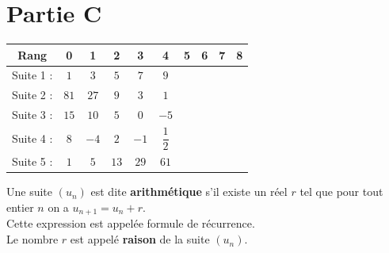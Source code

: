 \documentclass[a4paper,11pt,exos]{nsi} %
\begin{document}
\maketitle
\section*{Partie C}


\renewcommand{\arraystretch}{1.6}
\begin{tabular}{|c|c|c|c|c|c|c|c|c|c|}
	\hline
	\rowcolor{UGLiOrange}Rang & \hspace{0.5cm}0\hspace{0.5cm} & \hspace{0.5cm}1\hspace{0.5cm} & \hspace{0.5cm}2\hspace{0.5cm} & \hspace{0.5cm}3\hspace{0.5cm} & \hspace{0.5cm}4\hspace{0.5cm} & \hspace{0.5cm}5\hspace{0.5cm} & \hspace{0.5cm}6\hspace{0.5cm} & \hspace{0.5cm}7\hspace{0.5cm} & \hspace{0.5cm}8\hspace{0.5cm}  \\
	\hline
	\cellcolor{UGLiOrange}Suite 1 : & $1$ & $3$ & $5$ & $7$ & $9$ & & & & \\
	\hline
	\cellcolor{UGLiOrange}Suite 2 : & $81$ & $27$ & $9$ & $3$ & $1$ & & & & \\
	\hline
	\cellcolor{UGLiOrange}Suite 3 : & $15$ & $10$ & $5$ & $0$ & $-5$ & & & & \\
	\hline
	\cellcolor{UGLiOrange}Suite 4 : & $8$ & $-4$ & $2$ & $-1$ & $\dfrac{1}{2}$ & & & & \\
	\hline
	\cellcolor{UGLiOrange}Suite 5 : & $1$ & $5$ & $13$ & $29$ & $61$ & & & & \\
	\hline
\end{tabular}


\begin{definition}[]
	Une suite $(u_n)$ est dite \textbf{arithmétique} s'il existe un réel $r$ tel que pour tout entier $n$ on a  $u_{n+1}=u_n+r$.\\
	Cette expression est appelée formule de récurrence.\\
	Le nombre $r$ est appelé \textbf{raison} de la suite $(u_n)$.
\end{definition}
\end{document}
